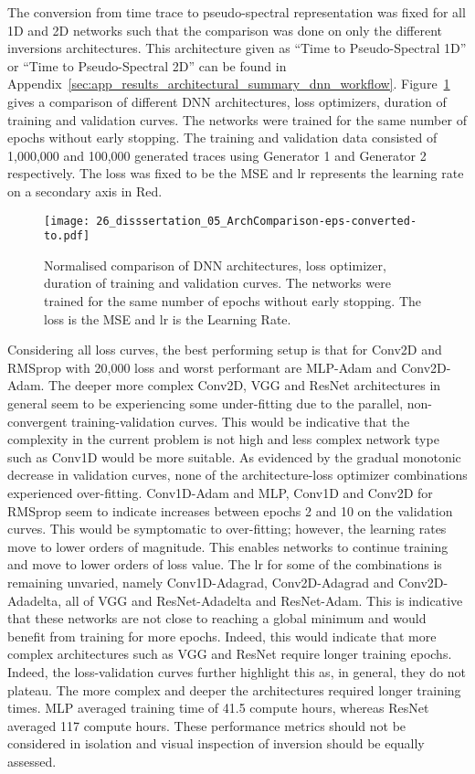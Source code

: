The conversion from time trace to pseudo-spectral representation was fixed for all 1D and 2D networks such that the comparison was done on only the different inversions architectures. This architecture given as ``Time to Pseudo-Spectral 1D'' or ``Time to Pseudo-Spectral 2D'' can be found in Appendix~\ref{sec:app_results_architectural_summary_dnn_workflow}. Figure~\ref{fig:dnn_fwi_1_comparison_dnn_arch} gives a comparison of different DNN architectures, loss optimizers, duration of training and validation curves. The networks were trained for the same number of epochs without early stopping. The training and validation data consisted of 1,000,000 and 100,000 generated traces using Generator 1 and Generator 2 respectively. The loss was fixed to be the MSE and lr represents the learning rate on a secondary axis in Red. 

\begin{figure}[ht!]
    \centering
    \texttt{[image: 26\_disssertation\_05\_ArchComparison-eps-converted-to.pdf]}
    \caption[Normalised comparison of DNN architectures]{Normalised comparison of DNN architectures, loss optimizer, duration of training and validation curves. The networks were trained for the same number of epochs without early stopping. The loss is the MSE and lr is the Learning Rate.}
    \label{fig:dnn_fwi_1_comparison_dnn_arch}
\end{figure}

Considering all loss curves, the best performing setup is that for Conv2D and RMSprop with 20,000 loss and worst performant are MLP-Adam and Conv2D-Adam. The deeper more complex Conv2D, VGG and ResNet architectures in general seem to be experiencing some under-fitting due to the parallel, non-convergent training-validation curves. This would be indicative that the complexity in the current problem is not high and less complex network type such as Conv1D would be more suitable. As evidenced by the gradual monotonic decrease in validation curves, none of the architecture-loss optimizer combinations experienced over-fitting. Conv1D-Adam and MLP, Conv1D and Conv2D for RMSprop seem to indicate increases between epochs 2 and 10 on the validation curves. This would be symptomatic to over-fitting; however, the learning rates move to lower orders of magnitude. This enables networks to continue training and move to lower orders of loss value. The lr for some of the combinations is remaining unvaried, namely Conv1D-Adagrad, Conv2D-Adagrad and Conv2D-Adadelta, all of VGG and ResNet-Adadelta and ResNet-Adam. This is indicative that these networks are not close to reaching a global minimum and would benefit from training for more epochs. Indeed, this would indicate that more complex architectures such as VGG and ResNet require longer training epochs. Indeed, the loss-validation curves further highlight this as, in general, they do not plateau. The more complex and deeper the architectures required longer training times. MLP averaged training time of 41.5 compute hours, whereas ResNet averaged 117 compute hours. These performance metrics should not be considered in isolation and visual inspection of inversion should be equally assessed.

